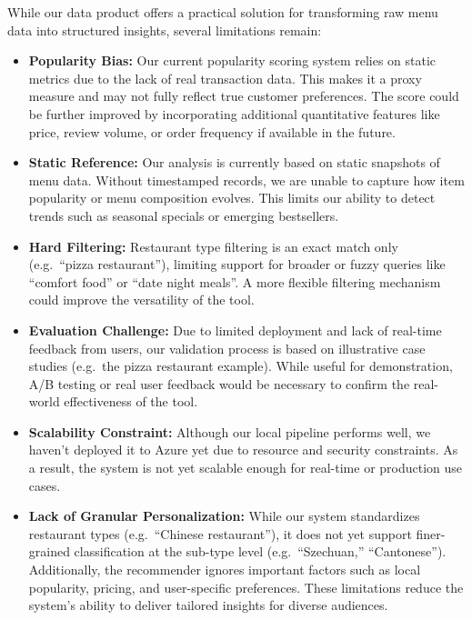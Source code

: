 \documentclass[
  11pt,
  a4paper,
  DIV=11,
  numbers=noendperiod]{scrartcl}
\providecommand{\tightlist}{%
  \setlength{\itemsep}{0pt}\setlength{\parskip}{0pt}}\usepackage{longtable,booktabs,array}
\begin{document}
While our data product offers a practical solution for transforming raw
menu data into structured insights, several limitations remain:

\begin{itemize}
\tightlist
\item
  \textbf{Popularity Bias:} Our current popularity scoring system relies
  on static metrics due to the lack of real transaction data. This makes
  it a proxy measure and may not fully reflect true customer
  preferences. The score could be further improved by incorporating
  additional quantitative features like price, review volume, or order
  frequency if available in the future.
\item
  \textbf{Static Reference:} Our analysis is currently based on static
  snapshots of menu data. Without timestamped records, we are unable to
  capture how item popularity or menu composition evolves. This limits
  our ability to detect trends such as seasonal specials or emerging
  bestsellers.
\item
  \textbf{Hard Filtering:} Restaurant type filtering is an exact match
  only (e.g.~``pizza restaurant''), limiting support for broader or
  fuzzy queries like ``comfort food'' or ``date night meals''. A more
  flexible filtering mechanism could improve the versatility of the
  tool.
\item
  \textbf{Evaluation Challenge:} Due to limited deployment and lack of
  real-time feedback from users, our validation process is based on
  illustrative case studies (e.g.~the pizza restaurant example). While
  useful for demonstration, A/B testing or real user feedback would be
  necessary to confirm the real-world effectiveness of the tool.
\item
  \textbf{Scalability Constraint:} Although our local pipeline performs
  well, we haven't deployed it to Azure yet due to resource and security
  constraints. As a result, the system is not yet scalable enough for
  real-time or production use cases.
\item
  \textbf{Lack of Granular Personalization:} While our system
  standardizes restaurant types (e.g.~``Chinese restaurant''), it does
  not yet support finer-grained classification at the sub-type level
  (e.g.~``Szechuan,'' ``Cantonese''). Additionally, the recommender
  ignores important factors such as local popularity, pricing, and
  user-specific preferences. These limitations reduce the system's
  ability to deliver tailored insights for diverse audiences.
\end{itemize}
\end{document}
